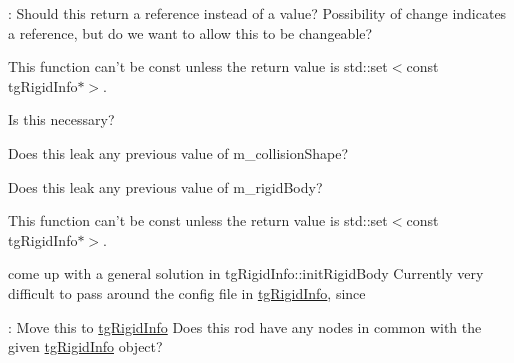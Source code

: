 \begin{DoxyRefList}
\-: Should this return a reference instead of a value? Possibility of change indicates a reference, but do we want to allow this to be changeable?  
\item[\label{todo__todo000098}%
\hypertarget{todo__todo000098}{}%
Member \hyperlink{classtg_rigid_info_ad1d699be1d892fac10575f7dd1d1d6de}{tg\-Rigid\-Info\-:\-:get\-Leaf\-Rigids} ()=0]This function can't be const unless the return value is std\-::set$<$const tg\-Rigid\-Info$\ast$$>$.  
\item[\label{todo__todo000095}%
\hypertarget{todo__todo000095}{}%
Member \hyperlink{classtg_rigid_info_aa20950230ff2c3346af0629e1ecd0f51}{tg\-Rigid\-Info\-:\-:is\-Compound} () const ]Is this necessary?  
\item[\label{todo__todo000092}%
\hypertarget{todo__todo000092}{}%
Member \hyperlink{classtg_rigid_info_a8b6d9ed5609dad929593f6f7f82d3f92}{tg\-Rigid\-Info\-:\-:set\-Collision\-Shape} (bt\-Collision\-Shape $\ast$p\-\_\-bt\-Collision\-Shape)]Does this leak any previous value of m\-\_\-collision\-Shape?  
\item[\label{todo__todo000093}%
\hypertarget{todo__todo000093}{}%
Member \hyperlink{classtg_rigid_info_a6a27b3d380b20c36a1c41392b7f6e2be}{tg\-Rigid\-Info\-:\-:set\-Rigid\-Body} (bt\-Rigid\-Body $\ast$rigid\-Body)]Does this leak any previous value of m\-\_\-rigid\-Body?  
\item[\label{todo__todo000102}%
\hypertarget{todo__todo000102}{}%
Member \hyperlink{classtg_rod_info_ad35a38bd39a06c1c1e592451a7178885}{tg\-Rod\-Info\-:\-:get\-Leaf\-Rigids} ()]This function can't be const unless the return value is std\-::set$<$const tg\-Rigid\-Info$\ast$$>$.  
\item[\label{todo__todo000101}%
\hypertarget{todo__todo000101}{}%
Member \hyperlink{classtg_rod_info_a9de55488229d7533834d9b67c8a9562c}{tg\-Rod\-Info\-:\-:init\-Rigid\-Body} (\hyperlink{classtg_world}{tg\-World} \&world)]come up with a general solution in tg\-Rigid\-Info\-::init\-Rigid\-Body Currently very difficult to pass around the config file in \hyperlink{classtg_rigid_info}{tg\-Rigid\-Info}, since  
\item[\label{todo__todo000103}%
\hypertarget{todo__todo000103}{}%
Member \hyperlink{classtg_rod_info_aaeb0b149e81d3ff85f191b913889e54f}{tg\-Rod\-Info\-:\-:shares\-Nodes\-With} (const \hyperlink{classtg_rigid_info}{tg\-Rigid\-Info} \&other) const ]\-: Move this to \hyperlink{classtg_rigid_info}{tg\-Rigid\-Info} Does this rod have any nodes in common with the given \hyperlink{classtg_rigid_info}{tg\-Rigid\-Info} object?  

\end{DoxyRefList}
